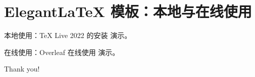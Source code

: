\documentclass[8pt]{beamer}
\begin{document}
\section{Elegant\LaTeX{} 模板：本地与在线使用}

\begin{frame}{本地使用：\TeX{} Live 2022 的安装}
  演示。
\end{frame}

\begin{frame}{在线使用：Overleaf 在线使用}
  演示。
\end{frame}




\begin{frame}[standout]
  Thank you!
\end{frame}
\end{document}
